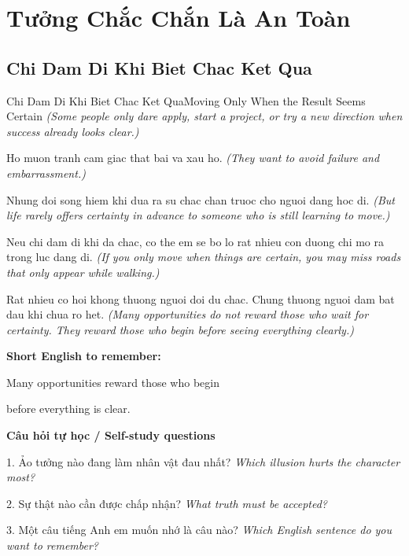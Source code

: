 \chapter{Tưởng Chắc Chắn Là An Toàn}

\section{Chi Dam Di Khi Biet Chac Ket Qua}
\begin{truyen}{Chi Dam Di Khi Biet Chac Ket Qua}{Moving Only When the Result Seems Certain}
\textit{(Some people only dare apply, start a project, or try a new direction when success already looks clear.)}

Ho muon tranh cam giac that bai va xau ho.
\textit{(They want to avoid failure and embarrassment.)}

Nhung doi song hiem khi dua ra su chac chan truoc cho nguoi dang hoc di.
\textit{(But life rarely offers certainty in advance to someone who is still learning to move.)}

Neu chi dam di khi da chac, co the em se bo lo rat nhieu con duong chi mo ra trong luc dang di.
\textit{(If you only move when things are certain, you may miss roads that only appear while walking.)}

\end{truyen}

\begin{baihoc}
Rat nhieu co hoi khong thuong nguoi doi du chac. Chung thuong nguoi dam bat dau khi chua ro het.
\textit{(Many opportunities do not reward those who wait for certainty. They reward those who begin before seeing everything clearly.)}
\end{baihoc}

\begin{ghinhoanh}
\textbf{Short English to remember:}

Many opportunities reward those who begin

before everything is clear.

\end{ghinhoanh}

\begin{tuhocnhanh}
\textbf{Câu hỏi tự học / Self-study questions}

1. Ảo tưởng nào đang làm nhân vật đau nhất? \textit{Which illusion hurts the character most?}

2. Sự thật nào cần được chấp nhận? \textit{What truth must be accepted?}

3. Một câu tiếng Anh em muốn nhớ là câu nào? \textit{Which English sentence do you want to remember?}
\end{tuhocnhanh}
\ngancach

